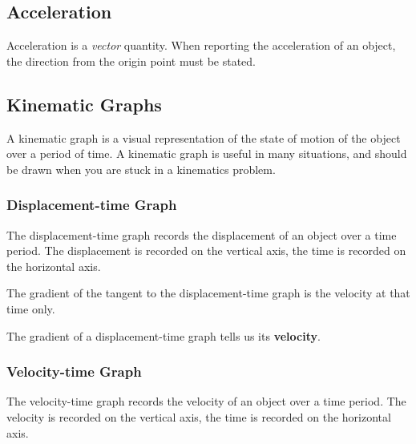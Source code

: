 \documentclass[../main.tex]{subfiles}
\begin{document}
		\subsection{Acceleration}
		Acceleration is a \textit{vector} quantity. When reporting the acceleration of an object, the direction from the origin point must be stated.
		
		\subsection{Kinematic Graphs}
		A kinematic graph is a visual representation of the state of motion of the object over a period of time. A kinematic graph is useful in many situations, and should be drawn when you are stuck in a kinematics problem.
		
		\subsubsection{Displacement-time Graph}
		The displacement-time graph records the displacement of an object over a time period. The displacement is recorded on the vertical axis, the time is recorded on the horizontal axis.
		
		\begin{center}
		\begin{framed}
			The gradient of the tangent to the displacement-time graph is the velocity at that time only.
		\end{framed}
		\end{center}
		
		The gradient of a displacement-time graph tells us its \textbf{velocity}.
		
		\subsubsection{Velocity-time Graph}	
		The velocity-time graph records the velocity of an object over a time period. The velocity is recorded on the vertical axis, the time is recorded on the horizontal axis.
		
\end{document}
